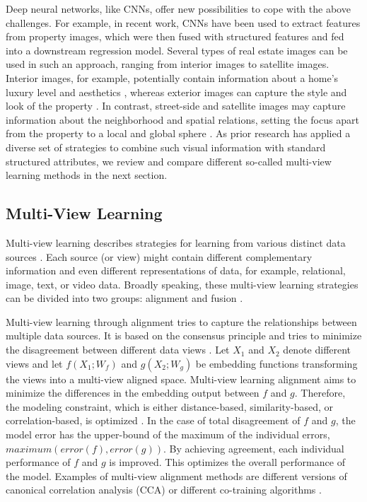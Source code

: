 \documentclass[letterpaper]{article} %
\begin{document}
Deep neural networks, like CNNs, offer new possibilities to cope with the above challenges. For example, in recent work, CNNs have been used to extract features from property images, which were then fused with structured features and fed into a downstream regression model. Several types of real estate images can be used in such an approach, ranging from interior images to satellite images. Interior images, for example, potentially contain information about a home's luxury level and aesthetics \cite{poursaeed2018vision, naumzik2020one}, whereas exterior images can capture the style and look of the property \cite{bessinger2016quantifying}. In contrast, street-side and satellite images may capture information about the neighborhood and spatial relations, setting the focus apart from the property to a local and global sphere \cite{law2019take, bency2017beyond, kucklick2020location}. As prior research has applied a diverse set of strategies to combine such visual information with standard structured attributes, we review and compare different so-called multi-view learning methods in the next section.

\subsection{Multi-View Learning}
Multi-view learning describes strategies for learning from various distinct data sources \cite{sun2013survey}. Each source (or view) might contain different complementary information and even different representations of data, for example, relational, image, text, or video data.
Broadly speaking, these multi-view learning strategies can be divided into two groups: alignment and fusion \cite{li2018survey}.

Multi-view learning through alignment tries to capture the relationships between multiple data sources. It is based on the consensus principle and tries to minimize the disagreement between different data views \cite{xu2013survey}. Let $X_1$ and $X_2$ denote different views and let $f(X_1; W_f)$ and $g(X_2; W_g)$ be embedding functions transforming the views into a multi-view aligned space. Multi-view learning alignment aims to minimize the differences in the embedding output between $f$ and $g$. Therefore, the modeling constraint, which is either distance-based, similarity-based, or correlation-based, is optimized \cite{li2018survey}. In the case of total disagreement of $f$ and $g$, the model error has the upper-bound of the maximum of the individual errors, $maximum(error(f), error(g))$. By achieving agreement, each individual performance of $f$ and $g$ is improved. This optimizes the overall performance of the model. Examples of multi-view alignment methods are different versions of canonical correlation analysis (CCA) \cite{li2018survey} or different co-training algorithms \cite{zhao2017multi}.
\end{document}
